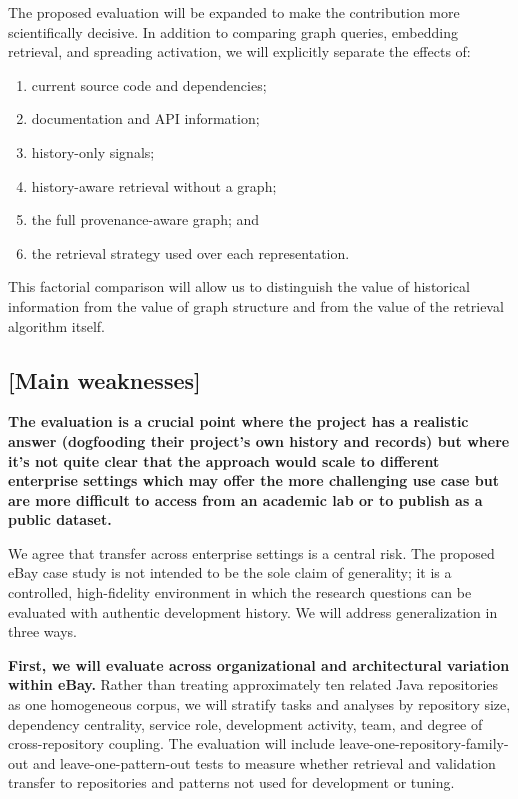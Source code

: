 \documentclass[11pt]{article}
\begin{document}
The proposed evaluation will be expanded to make the contribution more scientifically decisive. In addition to comparing graph queries, embedding retrieval, and spreading activation, we will explicitly separate the effects of:

\begin{enumerate}
  \item current source code and dependencies;
  \item documentation and API information;
  \item history-only signals;
  \item history-aware retrieval without a graph;
  \item the full provenance-aware graph; and
  \item the retrieval strategy used over each representation.
\end{enumerate}

This factorial comparison will allow us to distinguish the value of historical information from the value of graph structure and from the value of the retrieval algorithm itself.

\subsection*{[Main weaknesses]}

\textbf{The evaluation is a crucial point where the project has a realistic answer (dogfooding their project's own history and records) but where it's not quite clear that the approach would scale to different enterprise settings which may offer the more challenging use case but are more difficult to access from an academic lab or to publish as a public dataset.} 

We agree that transfer across enterprise settings is a central risk. The proposed eBay case study is not intended to be the sole claim of generality; it is a controlled, high-fidelity environment in which the research questions can be evaluated with authentic development history. We will address generalization in three ways.

\textbf{First, we will evaluate across organizational and architectural variation within eBay.} Rather than treating approximately ten related Java repositories as one homogeneous corpus, we will stratify tasks and analyses by repository size, dependency centrality, service role, development activity, team, and degree of cross-repository coupling. The evaluation will include leave-one-repository-family-out and leave-one-pattern-out tests to measure whether retrieval and validation transfer to repositories and patterns not used for development or tuning.
\end{document}
